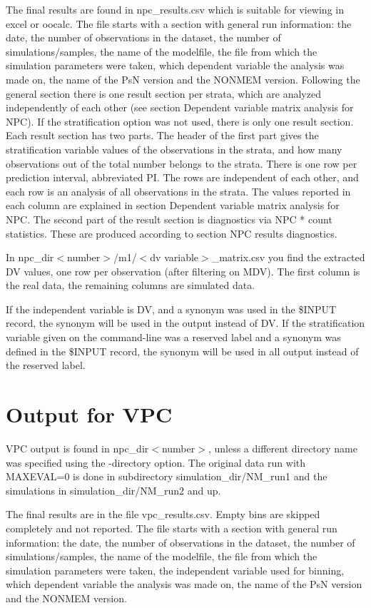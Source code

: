 The final results are found in npc\_results.csv which is suitable for viewing in excel or oocalc.  The file starts with a section with general run information: the date, the number of observations in the dataset, the number of simulations/samples, the name of the modelfile, the file from which the simulation parameters were taken, which dependent variable the analysis was made on, the name of the PsN version and the NONMEM version. Following the general section there is one result section per strata, which are analyzed independently of each other (see section Dependent variable matrix analysis for NPC). If the stratification option was not used, there is only one result section. Each result section has two parts. The header of the first part gives the stratification variable values of the observations in the strata, and how many observations out of the total number belongs to the strata. There is one row per prediction interval, abbreviated PI. The rows are independent of each other, and each row is an analysis of all observations in the strata. The values reported in each column are explained in section Dependent variable matrix analysis for NPC. The second part of the result section is diagnostics via NPC * count statistics. These are produced according to section NPC results diagnostics.	

In npc\_dir$<$number$>$/m1/$<$dv variable$>$\_matrix.csv you find the extracted DV values, one row per observation (after filtering on MDV). The first column is the real data, the remaining columns are simulated data.

If the independent variable is DV, and a synonym was used in the \$INPUT record, the synonym will be used in the output instead of DV.  If  the stratification variable given on the command-line was a reserved label and a synonym was defined in the \$INPUT record, the synonym will be used in all output instead of the reserved label.

\section{Output for VPC}
VPC output is found in npc\_dir$<$number$>$, unless a different directory name was specified using the -directory option. The original data run with MAXEVAL=0 is done in subdirectory simulation\_dir/NM\_run1 and the simulations in simulation\_dir/NM\_run2 and up. 

The final results are in the file vpc\_results.csv. Empty bins are skipped completely and not reported. The file starts with a section with general run information: the date, the number of observations in the dataset, the number of simulations/samples, the name of the modelfile, the file from which the simulation parameters were taken, the independent variable used for binning, which dependent variable the analysis was made on, the name of the PsN version and the NONMEM version. 

